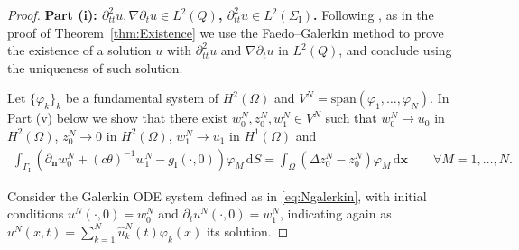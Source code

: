 \documentclass[a4paper]{article}
\theoremstyle{plain}
\theoremstyle{definition}
\newcommand{\dx}{{\,\mathrm{d}\vect x}}
\newcommand{\dS}{{\,\mathrm{d}S}}
\newcommand{\Grad}[1]{\nabla #1}
\newcommand{\Lap}[1]{\Delta #1}
\newcommand{\TimeDer}{{\partial^{}_t}}
\newcommand{\SecondTimeDer}{{\partial^2_{tt}}}
\newcommand{\NormDer}{{\partial_{\bm{n}}}}
\newcommand{\vect}[1]{\bm{#1}}
\newcommand{\GI}{{\Gamma_{\mathrm I}}}
\newcommand{\SI}{{\Sigma_{\mathrm I}}}
\newcommand{\gI}{{g_{\mathrm I}}}
\begin{document}
\begin{proof}
{\bf Part (i): $\SecondTimeDer{u},\Grad \TimeDer{u}\in L^2(Q)$, $\SecondTimeDer u\in L^2(\SI)$. \;}
    Following \cite[Thm.~IV.4.1]{ladyzhenskaya-bvp},
	as in the proof of Theorem~\ref{thm:Existence} we use the Faedo--Galerkin method to prove the existence of a solution $u$ with $\SecondTimeDer u$ and $\Grad \TimeDer{u}$ in $L^2(Q)$, and conclude using the uniqueness of such solution.

	Let $\{\varphi_k\}_k$ be a fundamental system of $H^2(\Omega)$ and $V^N = \mathrm{span}(\varphi_1, \dots, \varphi_N)$.
In Part (v) below we show that there exist $w_0^N, z_0^N, w_1^N\in V^N$ such that $w_0^N\rightarrow u_0$ in $H^2(\Omega)$, $z_0^N\rightarrow0$ in ${H^2(\Omega)}$, $w_1^N\rightarrow u_1$ in $H^1(\Omega)$ and
	\begin{align}\label{eq:w0w1z0}
		\int_\GI (\NormDer w_0^N+(c\theta)^{-1}w_1^N-\gI(\cdot, 0))\varphi_M\dS=\int_\Omega(\Lap z_0^N-z_0^N)\varphi_M\dx\qquad
		\forall M=1,\ldots,N. \end{align}

Consider the Galerkin ODE system defined as in \eqref{eq:Ngalerkin}, with initial conditions $u^N(\cdot, 0)=w^N_0$ and $\TimeDer u^N(\cdot, 0)=w^N_1$, indicating again as $u^N(x, t) = \sum_{k=1}^N \hat u^N_k(t) \varphi_k(x)$ its solution.


\end{proof}
\end{document}

